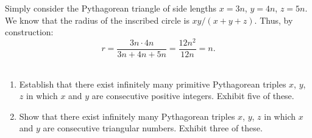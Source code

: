 \begin{solution}
    Simply consider the Pythagorean triangle of side lengths $x = 3n$, $y = 4n$, $z = 5n$. We know that the radius of the inscribed circle is $xy/(x+y+z)$. Thus, by construction:
    $$r = \frac{3n \cdot 4n}{3n + 4n + 5n} = \frac{12n^2}{12n} = n.$$ \\
\end{solution}

\begin{exercise}
    \begin{enumerate}
        \item Establish that there exist infinitely many primitive Pythagorean triples $x$, $y$, $z$ in which $x$ and $y$ are consecutive positive integers. Exhibit five of these. 
        \item Show that there exist infinitely many Pythagorean triples $x$, $y$, $z$ in which $x$ and $y$ are consecutive triangular numbers. Exhibit three of these. \\
    \end{enumerate}
\end{exercise}

